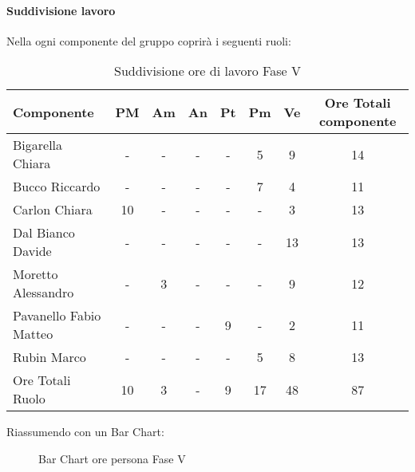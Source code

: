 			\paragraph{Suddivisione lavoro}
				Nella  ogni componente del gruppo \groupname{} coprirà i seguenti ruoli:
				\begin{table}
					\begin{center}
						\begin{tabular}{| l | c | c | c | c | c | c | c |}
							\hline
							Componente 					& PM		& Am 		& An 		& Pt 		& Pm 		& Ve 		& Ore Totali componente \\ \hline
							
							Bigarella Chiara 			& - 		& - 		& - 		& - 		& 5 		& 9 		& 14 \\
							Bucco Riccardo 				& - 		& - 		& - 		& - 		& 7			& 4 		& 11 \\
							Carlon Chiara	 			& 10 		& - 		& - 		& - 		& - 		& 3 		& 13 \\
							Dal Bianco Davide 			& - 		& - 		& - 		& - 		& - 		& 13 		& 13 \\
							Moretto Alessandro 			& - 		& 3 		& - 		& - 		& - 		& 9 		& 12 \\
							Pavanello Fabio Matteo	 	& - 		& - 		& - 		& 9 		& - 		& 2 		& 11 \\
							Rubin Marco					& - 		& - 		& - 		& - 		& 5 		& 8 		& 13 \\ \hline \hline
							
							Ore Totali Ruolo 			& 10 		& 3 		& - 		& 9 		& 17 		& 48 		& 87\\ \hline
						\end{tabular}
					\end{center}
					\caption{Suddivisione ore di lavoro Fase V}
				\end{table}
				Riassumendo con un Bar Chart:
				\begin{figure}\centering
					\caption{Bar Chart ore persona Fase V}
				\end{figure}
